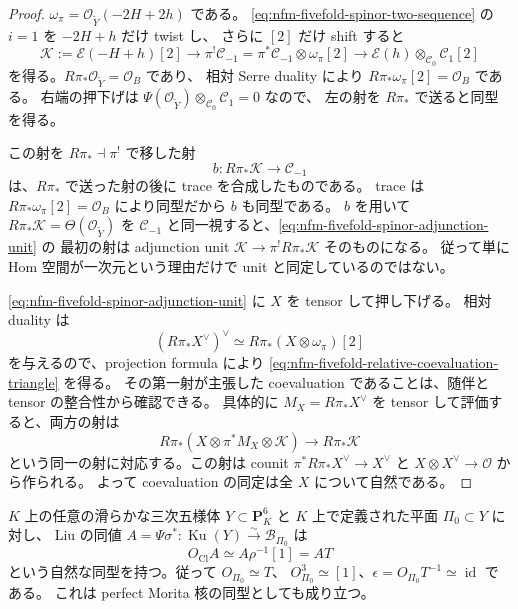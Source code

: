 \begin{proof}
$\omega_\pi=\mathcal O_{\widetilde Y}(-2H+2h)$ である。
\eqref{eq:nfm-fivefold-spinor-two-sequence} の $i=1$ を $-2H+h$ だけ twist し、
さらに $[2]$ だけ shift すると
\begin{equation}\label{eq:nfm-fivefold-spinor-adjunction-unit}
 \mathcal K:=\mathcal E(-H+h)[2]\longrightarrow
 \pi^!\mathcal C_{-1}=\pi^*\mathcal C_{-1}\otimes\omega_\pi[2]
 \longrightarrow\mathcal E(h)\otimes_{\mathcal C_0}\mathcal C_1[2]
\end{equation}
を得る。$R\pi_*\mathcal O_{\widetilde Y}=\mathcal O_B$ であり、
相対 Serre duality により $R\pi_*\omega_\pi[2]=\mathcal O_B$ である。
右端の押下げは $\Psi(\mathcal O_{\widetilde Y})\otimes_{\mathcal C_0}\mathcal C_1=0$ なので、
左の射を $R\pi_*$ で送ると同型を得る。

この射を $R\pi_*\dashv\pi^!$ で移した射
\[
 b:R\pi_*\mathcal K\longrightarrow\mathcal C_{-1}
\]
は、$R\pi_*$ で送った射の後に trace を合成したものである。
trace は $R\pi_*\omega_\pi[2]=\mathcal O_B$ により同型だから $b$ も同型である。
$b$ を用いて $R\pi_*\mathcal K=\Theta(\mathcal O_{\widetilde Y})$ を
$\mathcal C_{-1}$ と同一視すると、\eqref{eq:nfm-fivefold-spinor-adjunction-unit} の
最初の射は adjunction unit
$\mathcal K\to\pi^!R\pi_*\mathcal K$ そのものになる。
従って単に Hom 空間が一次元という理由だけで unit と同定しているのではない。

\eqref{eq:nfm-fivefold-spinor-adjunction-unit} に $X$ を tensor して押し下げる。
相対 duality は
\[
 (R\pi_*X^\vee)^\vee\simeq R\pi_*(X\otimes\omega_\pi)[2]
\]
を与えるので、projection formula により
\eqref{eq:nfm-fivefold-relative-coevaluation-triangle} を得る。
その第一射が主張した coevaluation であることは、随伴と tensor の整合性から確認できる。
具体的に $M_X=R\pi_*X^\vee$ を tensor して評価すると、両方の射は
\[
 R\pi_*(X\otimes\pi^*M_X\otimes\mathcal K)
 \longrightarrow R\pi_*\mathcal K
\]
という同一の射に対応する。この射は counit
$\pi^*R\pi_*X^\vee\to X^\vee$ と $X\otimes X^\vee\to\mathcal O$ から作られる。
よって coevaluation の同定は全 $X$ について自然である。
\end{proof}

\begin{theorem}
\label{thm:nfm-fivefold-half-rotation-identification}
$K$ 上の任意の滑らかな三次五様体 $Y\subset\mathbf P^6_K$ と
$K$ 上で定義された平面 $\Pi_0\subset Y$ に対し、
Liu の同値 $A=\Psi\sigma^*:\operatorname{Ku}(Y)\xrightarrow\sim\mathcal B_{\Pi_0}$ は
\begin{equation}\label{eq:nfm-fivefold-half-rotation-identification}
 O_{\mathrm{Cl}}A\simeq A\rho^{-1}[1]=AT
\end{equation}
という自然な同型を持つ。従って $O_{\Pi_0}\simeq T$、
$O_{\Pi_0}^3\simeq[1]$、$\epsilon=O_{\Pi_0}T^{-1}\simeq\operatorname{id}$ である。
これは perfect Morita 核の同型としても成り立つ。
\end{theorem}

